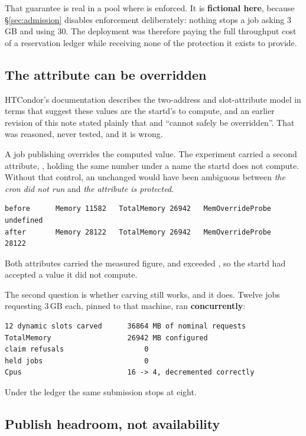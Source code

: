 That guarantee is real in a pool where  is enforced. It is
\textbf{fictional here}, because \S\ref{sec:admission} disables enforcement
deliberately: nothing stops a job asking 3\,GB and using 30. The deployment was
therefore paying the full throughput cost of a reservation ledger while
receiving none of the protection it exists to provide.

\subsection{The attribute can be overridden}

HTCondor's documentation describes the two-address and slot-attribute model in
terms that suggest these values are the startd's to compute, and an earlier
revision of this note stated plainly that  and  ``cannot
safely be overridden''. That was reasoned, never tested, and it is wrong.

A  job publishing  overrides the computed value.
The experiment carried a second attribute, , holding the
same number under a name the startd does not compute. Without that control, an
unchanged  would have been ambiguous between \emph{the cron did not
run} and \emph{the attribute is protected}.

\begin{lstlisting}[style=term]
before      Memory 11582   TotalMemory 26942   MemOverrideProbe undefined
after       Memory 28122   TotalMemory 26942   MemOverrideProbe    28122
\end{lstlisting}

Both attributes carried the measured figure, and  exceeded
, so the startd had accepted a value it did not compute.

The second question is whether carving still works, and it does. Twelve jobs
requesting 3\,GB each, pinned to that machine, ran \textbf{concurrently}:

\begin{lstlisting}[style=term]
12 dynamic slots carved      36864 MB of nominal requests
TotalMemory                  26942 MB configured
claim refusals                   0
held jobs                        0
Cpus                         16 -> 4, decremented correctly
\end{lstlisting}

Under the ledger the same submission stops at eight.

\subsection{Publish headroom, not availability}

